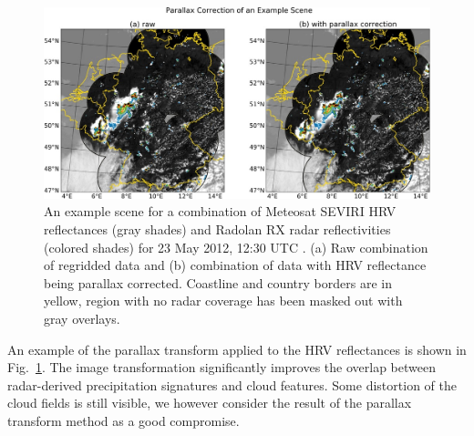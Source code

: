 \begin{figure}[!b]
\centering
\includegraphics[width=\textwidth]{Grafiken/Abbildungen/parallax_example.jpg}
\caption{An example scene for a combination of Meteosat SEVIRI HRV reflectances (gray shades) and Radolan RX radar reflectivities (colored shades) for 23 May 2012, 12:30 UTC . (a) Raw combination of regridded data and (b) combination of data with HRV reflectance being parallax corrected. Coastline and country borders are in yellow, region with no radar coverage has been masked out with gray overlays.}
\label{fig:parallax_example}
\end{figure}
An example of the parallax transform applied to the HRV reflectances is shown in Fig.~\ref{fig:parallax_example}. The image transformation significantly improves the overlap between radar-derived precipitation signatures and cloud features. Some distortion of the cloud fields is still visible, we however consider the result of the parallax transform method as a good compromise. 


